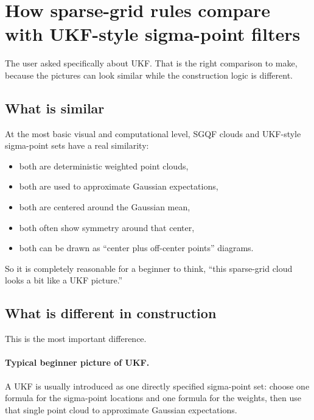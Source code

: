 \documentclass[11pt]{article}
\begin{document}
\section{How sparse-grid rules compare with UKF-style sigma-point filters}
\label{sec:ukf-comparison}

The user asked specifically about UKF.  That is the right comparison to make,
because the pictures can look similar while the construction logic is different.

\subsection{What is similar}

At the most basic visual and computational level, SGQF clouds and UKF-style
sigma-point sets have a real similarity:
\begin{itemize}[leftmargin=0.28in]
  \item both are deterministic weighted point clouds,
  \item both are used to approximate Gaussian expectations,
  \item both are centered around the Gaussian mean,
  \item both often show symmetry around that center,
  \item both can be drawn as ``center plus off-center points'' diagrams.
\end{itemize}
So it is completely reasonable for a beginner to think, ``this sparse-grid cloud
looks a bit like a UKF picture.''

\subsection{What is different in construction}

This is the most important difference.

\paragraph{Typical beginner picture of UKF.}
A UKF is usually introduced as one directly specified sigma-point set: choose one
formula for the sigma-point locations and one formula for the weights, then use
that single point cloud to approximate Gaussian expectations.
\end{document}
